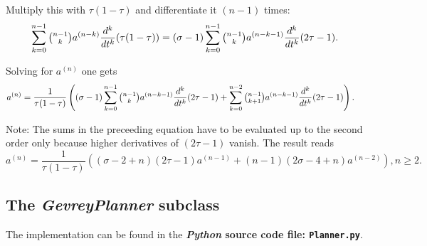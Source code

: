 \documentclass[a4paper,11pt,headings=standardclasses,parskip=half]{scrartcl}
\newcommand{\py}{\emph{Python}\xspace}
\begin{document}
\begin{appendices}
Multiply this with ${\tau(1-\tau)}$ and differentiate it $(n-1)$ times:
\begin{equation*}
\sum_{k=0}^{n-1}\tbinom{n-1}{k} a^{(n-k)}\frac{d^k}{dt^k}(\tau(1-\tau))={(\sigma-1)}\sum_{k=0}^{n-1}\tbinom
{n-1}{k} a^{(n-k-1)}\frac{d^k}{dt^k}(2\tau-1).
\end{equation*}

Solving for $a^{(n)}$ one gets
\small
\begin{align*}%
a^{(n)}&=\frac{1}{\tau(1-\tau)}\left((\sigma-1)\sum_{k=0}^{n-1}\tbinom{n-1}{k} a^{(n-k-1)}\frac{d^k}{dt^k}(2\tau-1)+\sum_{k=0}^{n-2}\tbinom{n-1}{k+1} a^{(n-k-1)}\frac{d^k}{dt^k}(2\tau-1)\right).
\end{align*}
\normalsize

Note: The sums in the preceeding equation have to be evaluated up to the second order only because higher derivatives of $(2\tau-1)$ vanish. The result reads
\begin{equation*}
a^{(n)}=\frac{1}{\tau(1-\tau)}\left((\sigma-2+n)(2\tau-1)a^{(n-1)}+(n-1)(2\sigma-4+n)a^{(n-2)}\right), n\ge 2.
\end{equation*}
\subsection{The \emph{GevreyPlanner} subclass}
The implementation can be found in the \textbf{\py source code file: \texttt{Planner.py}}.
\end{appendices}
\end{document}
